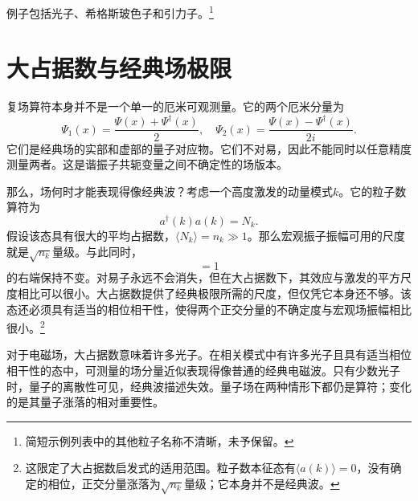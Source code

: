 \begin{classroomqa}
\end{classroomqa}


例子包括光子、希格斯玻色子和引力子。\footnote{简短示例列表中的其他粒子名称不清晰，未予保留。}

\section{大占据数与经典场极限}

复场算符本身并不是一个单一的厄米可观测量。它的两个厄米分量为
\begin{equation}
\Psi_1(x)=\frac{\Psi(x)+\Psi^\dagger(x)}{2},
\quad
\Psi_2(x)=\frac{\Psi(x)-\Psi^\dagger(x)}{2i}.
\end{equation}
它们是经典场的实部和虚部的量子对应物。它们不对易，因此不能同时以任意精度测量两者。这是谐振子共轭变量之间不确定性的场版本。

那么，场何时才能表现得像经典波？考虑一个高度激发的动量模式\(k\)。它的粒子数算符为
\begin{equation}
a^\dagger(k)a(k)=N_k.
\end{equation}
假设该态具有很大的平均占据数，\(\langle N_k\rangle=n_k\gg 1\)。那么宏观振子振幅可用的尺度就是\(\sqrt{n_k}\)量级。与此同时，
\begin{equation}
[a(k),a^\dagger(k)]=1
\end{equation}
的右端保持不变。对易子永远不会消失，但在大占据数下，其效应与激发的平方尺度相比可以很小。大占据数提供了经典极限所需的尺度，但仅凭它本身还不够。该态还必须具有适当的相位相干性，使得两个正交分量的不确定度与宏观场振幅相比很小。\footnote{这限定了大占据数启发式的适用范围。粒子数本征态有\(\langle a(k)\rangle=0\)，没有确定的相位，正交分量涨落为\(\sqrt{n_k}\)量级；它本身并不是经典波。}

对于电磁场，大占据数意味着许多光子。在相关模式中有许多光子且具有适当相位相干性的态中，可测量的场分量近似表现得像普通的经典电磁波。只有少数光子时，量子的离散性可见，经典波描述失效。量子场在两种情形下都仍是算符；变化的是其量子涨落的相对重要性。

\begin{classroomqa}
\end{classroomqa}

